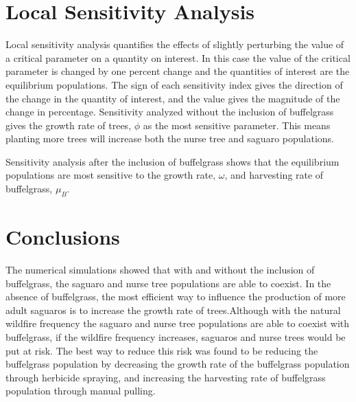 \documentclass[size=custom,width=48 in,height=42 in, landscape]{sciposter}
\begin{document}
\begin{multicols}{3}
\section{Local Sensitivity Analysis}
Local sensitivity analysis quantifies the effects of slightly perturbing the value of a critical parameter on a quantity on interest. In this case the value of the critical parameter is changed by one percent change and the quantities of interest are the equilibrium populations. The sign of each sensitivity index gives the direction of the change in the quantity of interest, and the value gives the magnitude of the change in percentage. Sensitivity analyzed without the inclusion of buffelgrass gives the growth rate of trees, $\phi$ as the most sensitive parameter. This means planting more trees will increase both the nurse tree and saguaro populations.\\

\vspace{-2cm}
\begin{table}

\end{table}

Sensitivity analysis after the inclusion of buffelgrass shows that the equilibrium populations are most sensitive to the growth rate, $\omega$, and harvesting rate of buffelgrass, $\mu_B$.\\

\vspace{-1cm}
\begin{table}
\centering

\end{table}

\vspace{-1cm}
\section{Conclusions}
The numerical simulations showed that with and without the inclusion of buffelgrass, the saguaro and nurse tree populations are able to coexist. In the absence of buffelgrass, the most efficient way to influence the production of more adult saguaros is to increase the growth rate of trees.Although with the natural wildfire frequency the saguaro and nurse tree populations are able to coexist with buffelgrass, if the wildfire frequency increases, saguaros and nurse trees would be put at risk. The best way to reduce this risk was found to be reducing the buffelgrass population by decreasing the growth rate of the buffelgrass population through herbicide spraying, and increasing the harvesting rate of buffelgrass population through manual pulling.

\end{multicols}
\end{document}
